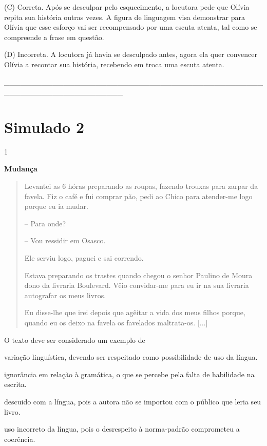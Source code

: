 (C) Correta. Após se desculpar pelo esquecimento, a locutora pede que
Olívia repita sua história outras vezes. A figura de linguagem visa
demonstrar para Olívia que esse esforço vai ser recompensado por uma
escuta atenta, tal como se compreende a frase em questão.

(D) Incorreta. A locutora já havia se desculpado antes, agora ela quer
convencer Olívia a recontar sua história, recebendo em troca uma escuta
atenta.

\_\_\_\_\_\_\_\_\_\_\_\_\_\_\_\_\_\_\_\_\_\_\_\_\_\_\_\_\_\_\_\_\_\_\_\_\_\_\_\_\_\_\_\_\_\_\_\_\_\_\_\_\_\_\_\_\_\_\_\_\_\_\_\_\_\_\_\_\_\_

\section{Simulado 2}

\num{1}

\textbf{Mudança}

\begin{quote}
Levantei as 6 hóras preparando as roupas, fazendo trouxas para zarpar da
favela. Fiz o café e fui comprar pão, pedi ao Chico para atender-me logo
porque eu ia mudar.

-- Para onde?

-- Vou ressidir em Osasco.

Ele serviu logo, paguei e sai correndo.

Estava preparando os trastes quando chegou o senhor Paulino de Moura
dono da livraria Boulevard. Vêio convidar-me para eu ir na sua livraria
autografar os meus livros.

Eu disse-lhe que irei depois que agêitar a vida dos meus filhos porque,
quando eu os deixo na favela os favelados maltrata-os. {[}...{]}
\end{quote}


O texto deve ser considerado um exemplo de

\begin{escolha}
\item variação linguística, devendo ser respeitado como possibilidade de
uso da língua.

\item ignorância em relação à gramática, o que se percebe pela falta de
habilidade na escrita.

\item descuido com a língua, pois a autora não se importou com o público
que leria seu livro.

\item uso incorreto da língua, pois o desrespeito à norma-padrão
comprometeu a coerência.
\end{escolha}

